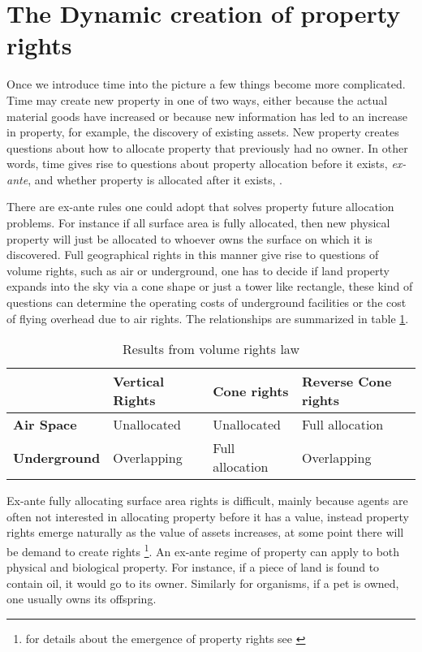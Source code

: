 \documentclass[12pt]{article}
\numberwithin{equation}{section}
\begin{document}
\newpage

\section{The Dynamic creation of property rights}

Once we introduce time into the picture a few things become more complicated. Time may create new property in one of two ways, either because the actual material goods have increased or because new information has led to an increase in property, for example, the discovery of existing assets. New property creates questions about how to allocate property that previously had no owner. In other words, time gives rise to questions about property allocation before it exists, \textit{ex-ante}, and whether property is allocated after it exists, . 

There are ex-ante rules one could adopt that solves property future allocation problems.  For instance if all surface area is fully allocated, then new physical property will just be allocated to whoever owns the surface on which it is discovered. Full geographical rights in this manner give rise to questions of volume rights, such as air or underground, one has to decide if land property expands into the sky via a cone shape or just a tower like rectangle, these kind of questions can determine the operating costs of underground facilities or the cost of flying overhead due to air rights. The relationships are summarized in table \ref{Volume}.

\begin{table}[t]
\begin{tabular}{|l|l|l|l|}
\hline
                     & \textbf{Vertical Rights}       & \textbf{Cone rights}          & \textbf{Reverse Cone rights}  \\ \hline
\textbf{Air Space}   & Unallocated             & Unallocated            & Full allocation \\ \hline
\textbf{Underground} & Overlapping & Full allocation & Overlapping       \\ \hline
\end{tabular}
\caption{Results from volume rights law}
\label{Volume}
\end{table}

Ex-ante fully allocating surface area rights is difficult, mainly because agents are often not interested in allocating property before it has a value, instead property rights emerge naturally as the value of assets increases, at some point there will be demand to create rights \footnote{for details about the emergence of property rights see \cite{Alchian1973}}. An ex-ante regime of property can apply to both physical and biological property. For instance, if a piece of land is found to contain oil, it would go to its owner. Similarly for organisms, if a pet is owned, one usually owns its offspring.
\end{document}
